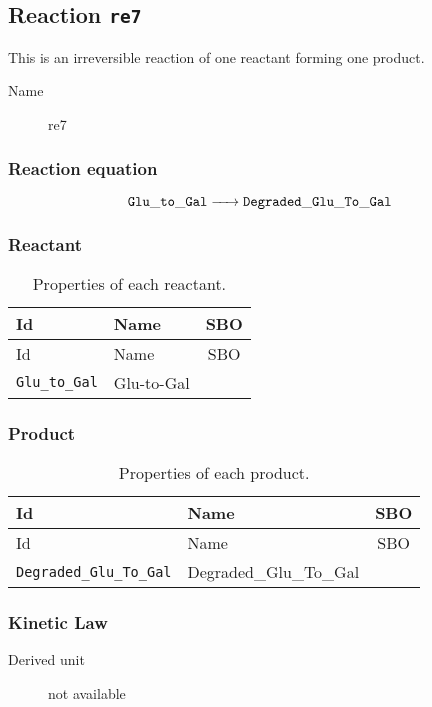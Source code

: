\documentclass[11pt,twoside,bibtotoc,a4paper]{scrartcl}
\newcommand{\reaction}[1]{\begin{equation}\ce{#1}\end{equation}}
\begin{document}
\subsection{Reaction \texttt{re7}}
This is an irreversible reaction of one reactant forming one product.\begin{description}
\item[Name] re7
\end{description}

\subsubsection*{Reaction equation}
\reaction{ $\mathtt{Glu\-\_to\-\_Gal}$ ->  $\mathtt{Degraded\-\_Glu\-\_To\-\_Gal}$}

\subsubsection*{Reactant}
\begin{longtable}[h!]{llc}
\caption{Properties of each reactant.}\\
\toprule
Id & Name & SBO\\
\midrule
\endfirsthead
\toprule
Id & Name & SBO\\
\midrule
\endhead
\texttt{Glu\-\_to\-\_Gal}&Glu-to-Gal&\\
\bottomrule\end{longtable}

\subsubsection*{Product}
\begin{longtable}[h!]{llc}
\caption{Properties of each product.}\\
\toprule
Id & Name & SBO\\
\midrule
\endfirsthead
\toprule
Id & Name & SBO\\
\midrule
\endhead
\texttt{Degraded\-\_Glu\-\_To\-\_Gal}&Degraded\-\_Glu\-\_To\-\_Gal&\\
\bottomrule\end{longtable}

\subsubsection*{Kinetic Law}
\begin{description}
\item[Derived unit] not available
\end{description}
\end{document}
